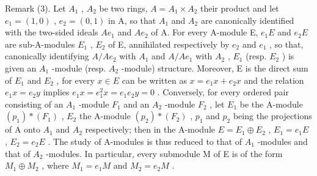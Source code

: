 Remark (3). Let \(A_{1}\) , \(A_{2}\) be two rings, \(A = A_{1} \times A_{2}\) their product and let \(e_{1} = (1, 0)\) , \(e_{2} = (0, 1)\) in A, so that \(A_{1}\) and \(A_{2}\) are canonically identified with the two-sided ideals \(Ae_{1}\) and \(Ae_{2}\) of A. For every A-module E, \(e_{1}E\) and \(e_{2}E\) are sub-A-modules \(E_{1}\) , \(E_{2}\) of E, annihilated respectively by \(e_{2}\) and \(e_{1}\) , so that, canonically identifying \(A/Ae_{2}\) with \(A_{1}\) and \(A/Ae_{1}\) with \(A_{2}\) , \(E_{1}\) (resp. \(E_{2}\) ) is given an \(A_{1}\) -module (resp. \(A_{2}\) -module) structure. Moreover, E is the direct sum of \(E_{1}\) and \(E_{2}\) , for every \(x \in E\) can be written as \(x = e_{1}x + e_{2}x\) and the relation \(e_{1}x = e_{2}y\) implies \(e_{1}x = e_{1}^{2}x = e_{1}e_{2}y = 0\) . Conversely, for every ordered pair consisting of an \(A_{1}\) -module \(F_{1}\) and an \(A_{2}\) -module \(F_{2}\) , let \(E_{1}\) be the A-module \((p_{1}) * (F_{1})\) , \(E_{2}\) the A-module \((p_{2}) * (F_{2})\) , \(p_{1}\) and \(p_{2}\) being the projections of A onto \(A_{1}\) and \(A_{2}\) respectively; then in the A-module \(E = E_{1} \oplus E_{2}\) , \(E_{1} = e_{1}E\) , \(E_{2} = e_{2}E\) . The study of A-modules is thus reduced to that of \(A_{1}\) -modules and that of \(A_{2}\) -modules. In particular, every submodule M of E is of the form \(M_{1} \oplus M_{2}\) , where \(M_{1} = e_{1}M\) and \(M_{2} = e_{2}M\) .


